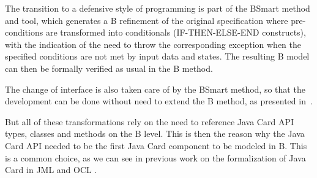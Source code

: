 \documentclass{llncs}
\begin{document}
The transition to a defensive style of programming is part of the
BSmart method and tool, which generates a B refinement of the original
specification where pre-conditions are transformed into conditionals
(IF-THEN-ELSE-END constructs), with the indication of the need to
throw the corresponding exception when the specified conditions are
not met by input data and states.  The resulting B model can then be
formally verified as usual in the B method.

The change of interface is also taken care of by the BSmart method, so
that the development can be done without need to extend the B
method, as presented in~\cite{Gomes10}.

But all of these transformations rely on the need to reference Java
Card API types, classes and methods on the B level.  This is then the
reason why the Java Card API needed to be the first Java Card
component to be modeled in B. This is a common choice, as we can see in previous work on the formalization of 
Java Card in JML \cite{pollBerg01} and OCL \cite{Larsson:2004}. 
\end{document}
